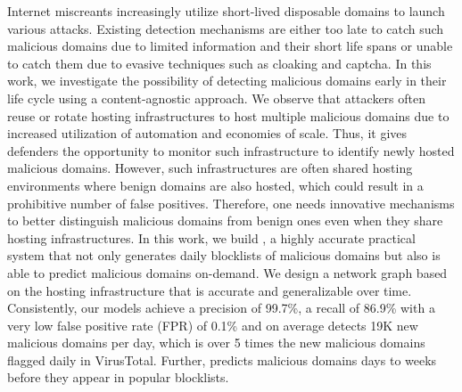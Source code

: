 Internet miscreants increasingly utilize short-lived disposable domains to launch various attacks. Existing detection mechanisms are either too late to catch such malicious domains due to limited information and their short life spans or unable to catch them due to evasive techniques such as cloaking and captcha. In this work, we investigate the possibility of detecting malicious domains early in their  life cycle using a content-agnostic approach.
We observe that attackers often reuse or rotate hosting infrastructures to host multiple malicious domains due to increased utilization of automation and economies of scale. 
Thus, it gives defenders the opportunity to monitor such infrastructure to identify newly hosted malicious domains. However, such infrastructures are often shared hosting environments where benign domains are also hosted, which could result in a prohibitive number of false positives. 
Therefore, one needs innovative mechanisms to better distinguish malicious domains from benign ones even when they share hosting infrastructures. In this work, we build \system, a highly accurate practical system that not only generates daily blocklists of malicious domains but also is able to predict malicious domains on-demand. We design a network graph based on the hosting infrastructure that is accurate and generalizable over time. Consistently, our models achieve a precision 
of 99.7\%, a recall of 86.9\% with a very low false positive rate (FPR) of 0.1\% and on average detects 19K new malicious domains per day, which is over 5 times the new malicious domains flagged daily in VirusTotal. Further, \system predicts malicious domains days to weeks before they appear in popular blocklists. 

